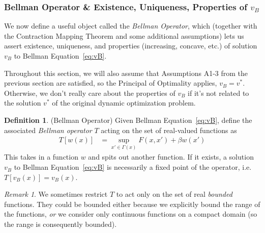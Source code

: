 \documentclass[12pt]{article}
\numberwithin{equation}{section} %
\theoremstyle{plain}
\newtheorem{prop}[thm]{Proposition}
\theoremstyle{definition}
\newtheorem{defn}[thm]{Definition}
\theoremstyle{remark}
\newtheorem*{rmk}{Remark}
\newcommand{\sB}{\mathscr{B}}
\newcommand{\R}{\mathbb{R}}
\begin{document}

\clearpage
\subsubsection{%
Bellman Operator \& Existence, Uniqueness, Properties of $v_B$
}

We now define a useful object called the \emph{Bellman Operator}, which
(together with the Contraction Mapping Theorem and some additional
assumptions) lets us assert existence, uniqueness, and properties
(increasing, concave, etc.) of solution $v_B$ to Bellman
Equation~\ref{eq:vB}.

Throughout this section, we will also assume that Assumptions A1-3 from
the previous section are satisfied, so the Principal of Optimality
applies, $v_B=v^*$. Otherwise, we don't really care about the properties
of $v_B$ if it's not related to the solution $v^*$ of the original
dynamic optimization problem.

\begin{defn}(Bellman Operator)
Given Bellman Equation~\ref{eq:vB}, define the associated
\emph{Bellman operator} $T$ acting on the set of real-valued functions
as
\begin{align}
  T[w(x)]
  &= \sup_{x'\in\Gamma(x)}
  F(x,x') + \beta w(x')
  \label{defn:bellman-operator}
\end{align}
This takes in a function $w$ and spits out another function.
If it exists, a solution $v_B$ to Bellman Equation~\ref{eq:vB} is
necessarily a fixed point of the operator, i.e. $T[v_B(x)]=v_B(x)$.
\end{defn}

\begin{rmk}
We sometimes restrict $T$ to act only on the set of real \emph{bounded}
functions. They could be bounded either because we explicitly bound the
range of the functions, \emph{or} we consider only continuous functions
on a compact domain (so the range is consequently bounded).
\end{rmk}

\end{document}
